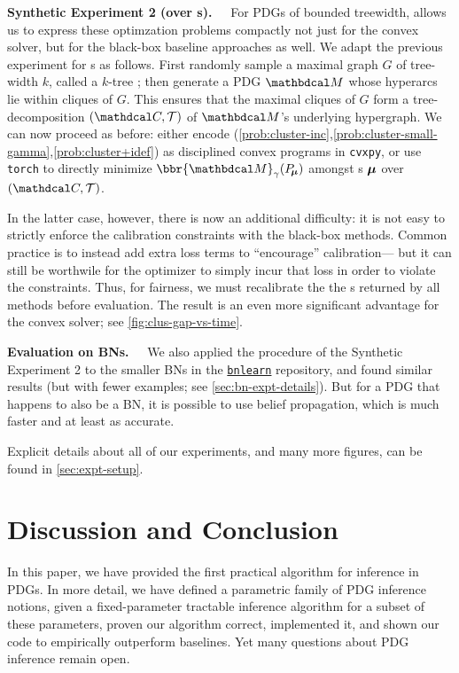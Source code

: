 \textbf{Synthetic Experiment 2 ({\normalfont over \actree s}).~~} 
For PDGs of bounded treewidth,  allows us to express these optimzation problems compactly not just for the convex solver, but for the black-box baseline approaches as well.
We adapt the previous experiment for \actree s as follows.
First randomly sample a maximal graph $G$ of tree-width $k$, called a 
    $k$-tree \parencite{patil1986structure}; 
then generate a PDG $\dg M$ whose hyperarcs lie within cliques of $G$.
This ensures that the maximal cliques of $G$ form a tree-decomposition $(\C, \mathcal T)$ of $\dg M$'s underlying
    hypergraph.
We can now proceed as before: 
    either encode
    (\ref{prob:cluster-inc},\ref{prob:cluster-small-gamma},\ref{prob:cluster+idef})
    as disciplined convex programs in \verb|cvxpy|,
or use \verb|torch| to directly minimize $\bbr{\dg M}_\gamma(\Pr_{\!\bmu})$
    amongst \actree s $\boldsymbol\mu$ over $(\C, \mathcal T)$.
    

In the latter case, however, there is now an additional difficulty:
    it is not easy to strictly enforce the calibration constraints with the black-box methods.
Common practice is to instead add extra loss terms to ``encourage'' calibration---%
but
    it can still be worthwile for the optimizer to simply incur that loss 
    in order to violate the constraints.
Thus, for fairness, we must recalibrate the 
    the \actree s returned by all methods before evaluation.
The result is an even more significant advantage for the convex solver; 
see \cref{fig:clus-gap-vs-time}.

\textbf{Evaluation on BNs.~~}
We also applied the procedure of the Synthetic Experiment 2
to the smaller BNs in the
\href{https://www.bnlearn.com/bnrepository/}{\texttt{bnlearn}} repository,
and found similar results (but with fewer examples; see \cref{sec:bn-expt-details}). 
But for a PDG that happens to also be a BN, it is possible to use belief propagation, which is much faster and at least as accurate.

Explicit details about all of our experiments, 
and many more figures, can be found in \cref{sec:expt-setup}.

\section{Discussion and Conclusion}

In this paper, we have provided the first practical algorithm for
    inference in PDGs. 
In more detail, we have defined a parametric family of PDG inference notions, 
given a fixed-parameter tractable inference algorithm for a subset of these parameters,
    proven our algorithm correct, implemented it, and
    shown our code to empirically outperform baselines.
Yet many questions about PDG inference remain open.

